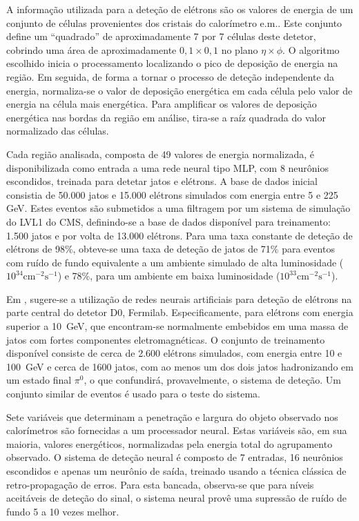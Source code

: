 A informação utilizada para a deteção de elétrons são os valores de energia de
um conjunto de células provenientes dos cristais do calorímetro e.m.. Este
conjunto define um ``quadrado'' de aproximadamente 7 por 7 células deste
detetor, cobrindo uma área de aproximadamente $0,1 \times 0,1$ no plano $\eta
\times \phi$. O algoritmo escolhido inicia o processamento localizando o pico
de deposição de energia na região. Em seguida, de forma a tornar o processo de
deteção independente da energia, normaliza-se o valor de deposição energética
em cada célula pelo valor de energia na célula mais energética. Para
amplificar os valores de deposição energética nas bordas da região em análise,
tira-se a raíz quadrada do valor normalizado das células.

Cada região analisada, composta de 49 valores de energia normalizada, é
disponibilizada como entrada a uma rede neural tipo MLP, com 8 neurônios
escondidos, treinada para detetar jatos e elétrons. A base de dados inicial
consistia de 50.000 jatos e 15.000 elétrons simulados com energia entre 5 e
225 GeV. Estes eventos são submetidos a uma filtragem por um sistema de
simulação do LVL1 do CMS, definindo-se a base de dados disponível para
treinamento: 1.500 jatos e por volta de 13.000 elétrons. Para uma taxa
constante de deteção de elétrons de 98\%, obteve-se uma taxa de deteção de
jatos de 71\% para eventos com ruído de fundo equivalente a um ambiente
simulado de alta luminosidade ($10^{34}\text{cm}^{-2}\text{s}^{-1}$) e 78\%,
para um ambiente em baixa luminosidade ($10^{33}\text{cm}^{-2}\text{s}^{-1}$).

Em \cite{chakraborty-acat-2001}, sugere-se a utilização de redes neurais
artificiais para deteção de elétrons na parte central do detetor D0,
Fermilab. Especificamente, para elétrons com energia superior a 10~GeV, que
encontram-se normalmente embebidos em uma massa de jatos com fortes
componentes eletromagnéticas. O conjunto de treinamento disponível consiste de
cerca de 2.600 elétrons simulados, com energia entre 10 e 100~GeV e cerca de
1600 jatos, com ao menos um dos dois jatos hadronizando em um estado final
$\pi^0$, o que confundirá, provavelmente, o sistema de deteção. Um conjunto
similar de eventos é usado para o teste do sistema.

Sete variáveis que determinam a penetração e largura do objeto observado nos
calorímetros são fornecidas a um processador neural. Estas variáveis são, em
sua maioria, valores energéticos, normalizadas pela energia total do
agrupamento observado. O sistema de deteção neural é composto de 7 entradas,
16 neurônios escondidos e apenas um neurônio de saída, treinado usando a
técnica clássica de retro-propagação de erros. Para esta bancada, observa-se
que para níveis aceitáveis de deteção do sinal, o sistema neural provê uma
supressão de ruído de fundo 5 a 10 vezes melhor.

